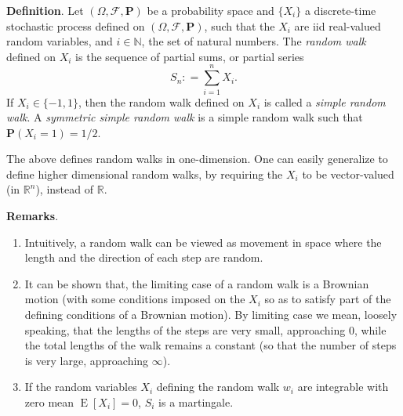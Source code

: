 \documentclass[12pt]{article}
\begin{document}
\textbf{Definition}.  Let $(\Omega,\mathcal{F},\mathbf{P})$ be a
probability space and $\lbrace X_i \rbrace$ a discrete-time
stochastic process defined on $(\Omega,\mathcal{F},\mathbf{P})$,
such that the $X_i$ are iid real-valued random variables, and
$i\in\mathbb{N}$, the set of natural numbers.  The \emph{random
walk} defined on $X_i$ is the sequence of partial sums, or partial
series $$S_n\colon=\sum_{i=1}^{n}X_i.$$  If $X_i\in\lbrace -1,1
\rbrace$, then the random walk defined on $X_i$ is called a
\emph{simple random walk}.  A \emph{symmetric simple random walk} is
a simple random walk such that $\mathbf{P}(X_i=1)=1/2$.

The above defines random walks in one-dimension.  One can easily
generalize to define higher dimensional random walks, by requiring
the $X_i$ to be vector-valued (in $\mathbb{R}^n$), instead of
$\mathbb{R}$.

\textbf{Remarks}.
\begin{enumerate}
\item  Intuitively, a random walk can be viewed as movement in space
where the length and the direction of each step are random.
\item  It can be shown that, the limiting case of a random walk is a
Brownian motion (with some conditions imposed on the $X_i$ so as to
satisfy part of the defining conditions of a Brownian motion). By
limiting case we mean, loosely speaking, that the lengths of the
steps are very small, approaching 0, while the total lengths of the
walk remains a constant (so that the number of steps is very large,
approaching $\infty$).
\item  If the random variables $X_i$ defining the random walk $w_i$
are integrable with zero mean $\operatorname{E}[X_i]=0$, $S_i$ is a
martingale.
\end{enumerate}
\end{document}
